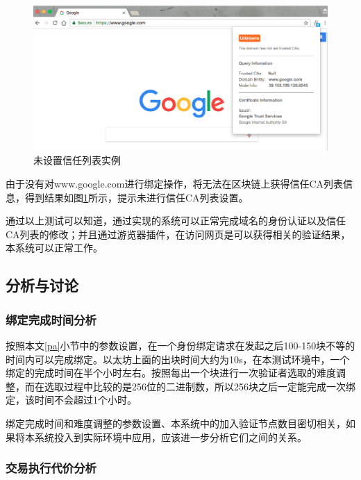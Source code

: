 \begin{figure}[!htbp]
 	\centering
 	\includegraphics[scale=0.45]{img/unknowns}
 	\caption{未设置信任列表实例}\label{fig:unknowns}
\end{figure}

由于没有对www.google.com进行绑定操作，将无法在区块链上获得信任CA列表信息，得到结果如图\ref{fig:unknowns}所示，提示未进行信任CA列表设置。



通过以上测试可以知道，通过实现的系统可以正常完成域名的身份认证以及信任CA列表的修改；并且通过游览器插件，在访问网页是可以获得相关的验证结果，本系统可以正常工作。



\subsection{分析与讨论}

\subsubsection{绑定完成时间分析}

按照本文\ref{pa}小节中的参数设置，在一个身份绑定请求在发起之后100-150块不等的时间内可以完成绑定。以太坊上面的出块时间大约为10s，在本测试环境中，一个绑定的完成时间在半个小时左右。按照每出一个块进行一次验证者选取的难度调整，而在选取过程中比较的是256位的二进制数，所以256块之后一定能完成一次绑定，该时间不会超过1个小时。

绑定完成时间和难度调整的参数设置、本系统中的加入验证节点数目密切相关，如果将本系统投入到实际环境中应用，应该进一步分析它们之间的关系。



\subsubsection{交易执行代价分析}

